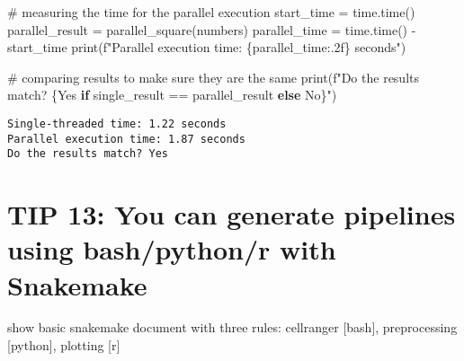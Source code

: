 \documentclass[
  letterpaper,
  DIV=11,
  numbers=noendperiod]{scrartcl}
\newenvironment{Shaded}{\begin{snugshade}}{\end{snugshade}}
\newcommand{\BuiltInTok}[1]{\textcolor[rgb]{0.00,0.23,0.31}{#1}}
\newcommand{\CommentTok}[1]{\textcolor[rgb]{0.37,0.37,0.37}{#1}}
\newcommand{\ControlFlowTok}[1]{\textcolor[rgb]{0.00,0.23,0.31}{\textbf{#1}}}
\newcommand{\NormalTok}[1]{\textcolor[rgb]{0.00,0.23,0.31}{#1}}
\newcommand{\OperatorTok}[1]{\textcolor[rgb]{0.37,0.37,0.37}{#1}}
\newcommand{\SpecialCharTok}[1]{\textcolor[rgb]{0.37,0.37,0.37}{#1}}
\newcommand{\SpecialStringTok}[1]{\textcolor[rgb]{0.13,0.47,0.30}{#1}}
\newcommand{\StringTok}[1]{\textcolor[rgb]{0.13,0.47,0.30}{#1}}
\begin{document}
\begin{Shaded}
\begin{Highlighting}[]
    \CommentTok{\# measuring the time for the parallel execution}
\NormalTok{    start\_time }\OperatorTok{=}\NormalTok{ time.time()}
\NormalTok{    parallel\_result }\OperatorTok{=}\NormalTok{ parallel\_square(numbers)}
\NormalTok{    parallel\_time }\OperatorTok{=}\NormalTok{ time.time() }\OperatorTok{{-}}\NormalTok{ start\_time}
    \BuiltInTok{print}\NormalTok{(}\SpecialStringTok{f"Parallel execution time: }\SpecialCharTok{\{}\NormalTok{parallel\_time}\SpecialCharTok{:.2f\}}\SpecialStringTok{ seconds"}\NormalTok{)}
    
    \CommentTok{\# comparing results to make sure they are the same}
    \BuiltInTok{print}\NormalTok{(}\SpecialStringTok{f"Do the results match? }\SpecialCharTok{\{}\StringTok{\textquotesingle{}Yes\textquotesingle{}} \ControlFlowTok{if}\NormalTok{ single\_result }\OperatorTok{==}\NormalTok{ parallel\_result }\ControlFlowTok{else} \StringTok{\textquotesingle{}No\textquotesingle{}}\SpecialCharTok{\}}\SpecialStringTok{"}\NormalTok{)}
\end{Highlighting}
\end{Shaded}

\begin{verbatim}
Single-threaded time: 1.22 seconds
Parallel execution time: 1.87 seconds
Do the results match? Yes
\end{verbatim}

\section{TIP 13: You can generate pipelines using bash/python/r with
Snakemake}\label{tip-13-you-can-generate-pipelines-using-bashpythonr-with-snakemake}

show basic snakemake document with three rules: cellranger {[}bash{]},
preprocessing {[}python{]}, plotting {[}r{]}
\end{document}
